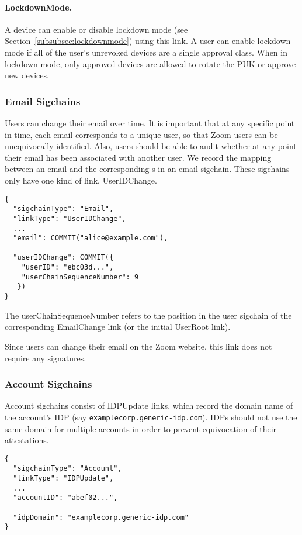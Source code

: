 \paragraph{LockdownMode.} A device can enable or disable lockdown mode (see
Section~\ref{subsubsec:lockdownmode}) using this link. A user can enable lockdown mode if all of the
user's unrevoked devices are a single approval class. When in lockdown mode, only approved devices
are allowed to rotate the PUK or approve new devices.


\subsubsection{Email Sigchains}

Users can change their email over time. It is important that at any specific point in time, each
email corresponds to a unique user, so that Zoom users can be unequivocally identified. Also, users
should be able to audit whether at any point their email has been associated with another user. We
record the mapping between an email and the corresponding {\userID}s in an email sigchain. These
sigchains only have one kind of link, \textsf{UserIDChange}.

\begin{Verbatim}
{
  "sigchainType": "Email",
  "linkType": "UserIDChange",
  ...
  "email": COMMIT("alice@example.com"),

  "userIDChange": COMMIT({
    "userID": "ebc03d...",
    "userChainSequenceNumber": 9
   })
}
\end{Verbatim}

The \textsf{userChainSequenceNumber} refers to the position in the user sigchain of the
corresponding \textsf{EmailChange} link (or the initial \textsf{UserRoot} link).

Since users can change their email on the Zoom website, this link does not require any signatures.

\subsubsection{Account Sigchains}

Account sigchains consist of \textsf{IDPUpdate} links, which record the domain
name of the account's IDP (say \texttt{examplecorp.generic-idp.com}). IDPs
should not use the same domain for multiple accounts in order to prevent equivocation of
their attestations.

\begin{Verbatim}
{
  "sigchainType": "Account",
  "linkType": "IDPUpdate",
  ...
  "accountID": "abef02...",

  "idpDomain": "examplecorp.generic-idp.com"
}
\end{Verbatim}

